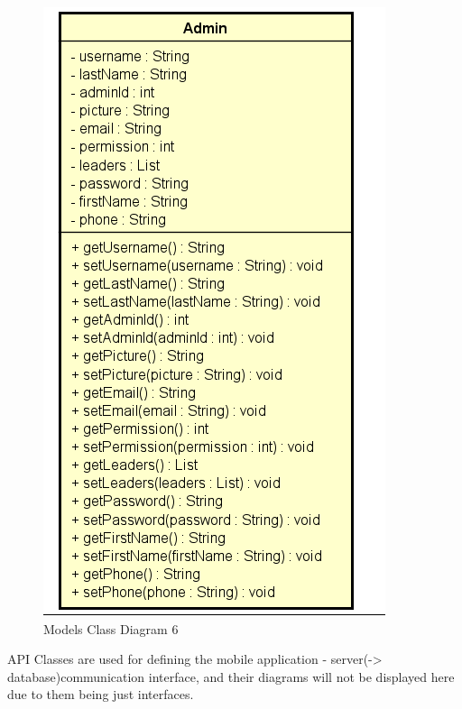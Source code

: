 		\begin{figure}[H]
			\includegraphics[width=\linewidth]{diagrams/Models Class Diagram_6.png}
			\caption{Models Class Diagram 6}
			\label{fig:models_class_diag_6}
		\end{figure}
			
		API Classes are used for defining the mobile application - server(-> database)communication interface, and their diagrams will not be displayed here due to them being just interfaces.
		
